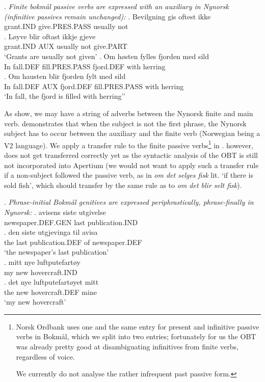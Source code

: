 \documentclass[11pt]{article}
\begin{document}
\setlength{\Exlabelsep}{1.1em} %
\alignSubExtrue %
\ex. \label{pass} \emph{Finite bokmål passive verbs are expressed with an auxiliary
  in Nynorsk (infinitive passives remain unchanged):}
\ag. Bevilgning gis oftest ikke\\
grant.IND give.PRES.PASS usually not\\
\bg. Løyve blir oftast ikkje gjeve\\
grant.IND AUX usually not give.PART \\
`Grants are usually not given'
\cg. Om høsten fylles fjorden med sild\\
In fall.DEF fill.PRES.PASS fjord.DEF with herring\\
\label{pass-syntax}
\dg. Om hausten blir fjorden fylt med sild\\
In fall.DEF AUX fjord.DEF fill.PRES.PASS with herring\\ 
`In fall, the fjord is filled with herring''

As \Last[a-b] show, we may have a string of adverbs between the
Nynorsk finite and main verb. \Last[c-d] demonstrates that when the
subject is not the first phrase, the Nynorsk subject has to occur
between the auxiliary and the finite verb (Norwegian being a V2
language). We apply a transfer rule to the finite passive
verbs\footnote{Norsk Ordbank uses
  one and the same entry for present and infinitive passive verbs in
  Bokmål, which we split into two entries; fortunately for us the
  OBT was already pretty good at disambiguating
  infinitives from finite verbs, regardless of voice. 

We currently
  do not analyse the
  rather infrequent past passive form.} in \Last[a-b]. \Last[c-d]
however, does not get transferred correctly yet as the syntactic
analysis of the OBT is still not incorporated into
Apertium (we would not want to apply such a transfer rule if a
non-subject followed the passive verb, as in \emph{om det selges fisk}
lit. `if there is sold fish', which should transfer by the same rule
as \Last[a-b] to \emph{om det
  blir selt fisk}).

\ex. \label{posgen} \emph{Phrase-initial Bokmål genitives are expressed
  periphrastically, phrase-finally in Nynorsk:}
\ag. avisens siste utgivelse\\
newspaper.DEF.GEN last publication.IND\\
\bg. den siste utgjevinga til avisa\\
the last publication.DEF of newspaper.DEF\\
`the newspaper's last publication'\\
\cg. mitt nye luftputefartøy\\
my new hovercraft.IND\\
\dg. det nye luftputefartøyet mitt\\
the new hovercraft.DEF mine\\
`my new hovercraft'
\end{document}
